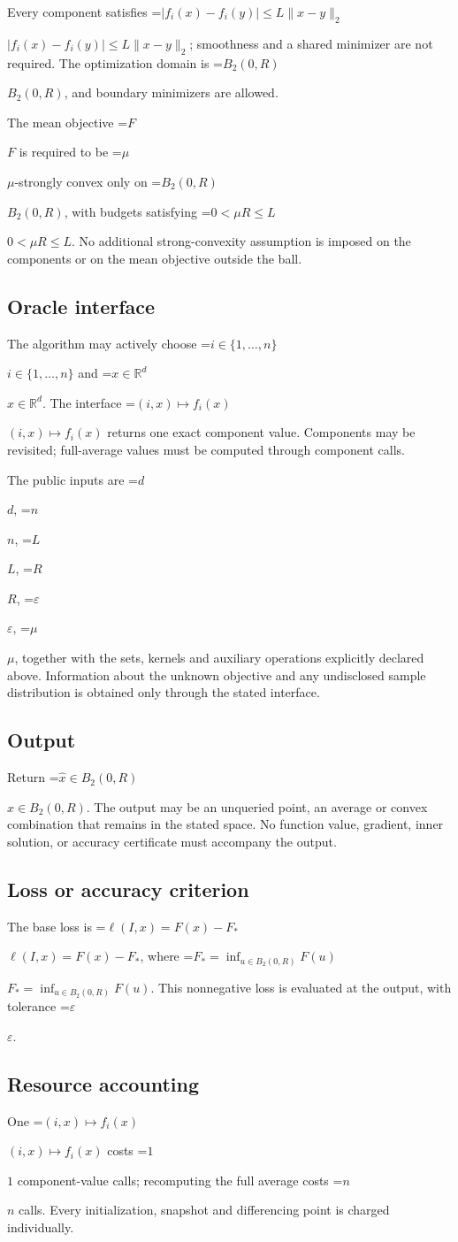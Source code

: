 \documentclass[10pt,a4paper]{article}
\newcommand{\AtlasMath}[1]{\par\begingroup\centering\setbox0=\hbox{$\displaystyle #1$}\ifdim\wd0>1.4\linewidth\typeout{ATLAS WIDE FORMULA: \the\wd0}\fi\ifdim\wd0>\linewidth\resizebox{\linewidth}{!}{\box0}\else\box0\fi\par\endgroup}
\newcommand{\AtlasInlineMath}[1]{\begingroup\setbox0=\hbox{$#1$}\ifdim\wd0>.4\linewidth\endgroup\AtlasMath{#1}\else\endgroup$#1$\fi}
\begin{document}
Every component satisfies \AtlasInlineMath{|f_i(x)-f_i(y)|\le L\|x-y\|_2}; smoothness and a shared minimizer are not required. The optimization domain is \AtlasInlineMath{B_2(0,R)}, and boundary minimizers are allowed.

The mean objective \AtlasInlineMath{F} is required to be \AtlasInlineMath{\mu}-strongly convex only on \AtlasInlineMath{B_2(0,R)}, with budgets satisfying \AtlasInlineMath{0<\mu R\le L}. No additional strong-convexity assumption is imposed on the components or on the mean objective outside the ball.

\subsection{Oracle interface}
The algorithm may actively choose \AtlasInlineMath{i\in\{1,\ldots,n\}} and \AtlasInlineMath{x\in\mathbb{R}^d}. The interface \AtlasInlineMath{(i,x)\mapsto f_i(x)} returns one exact component value. Components may be revisited; full-average values must be computed through component calls.

The public inputs are \AtlasInlineMath{d}, \AtlasInlineMath{n}, \AtlasInlineMath{L}, \AtlasInlineMath{R}, \AtlasInlineMath{\varepsilon}, \AtlasInlineMath{\mu}, together with the sets, kernels and auxiliary operations explicitly declared above. Information about the unknown objective and any undisclosed sample distribution is obtained only through the stated interface.

\subsection{Output}
Return \AtlasInlineMath{\widehat{x}\in B_2(0,R)}. The output may be an unqueried point, an average or convex combination that remains in the stated space. No function value, gradient, inner solution, or accuracy certificate must accompany the output.

\subsection{Loss or accuracy criterion}
The base loss is \AtlasInlineMath{\ell(I,x)=F(x)-F_*}, where \AtlasInlineMath{F_*=\inf_{u\in B_2(0,R)}F(u)}. This nonnegative loss is evaluated at the output, with tolerance \AtlasInlineMath{\varepsilon}.

\subsection{Resource accounting}
One \AtlasInlineMath{(i,x)\mapsto f_i(x)} costs \AtlasInlineMath{1} component-value calls; recomputing the full average costs \AtlasInlineMath{n} calls. Every initialization, snapshot and differencing point is charged individually.
\end{document}
